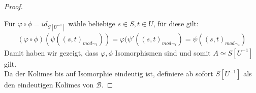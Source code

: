 \documentclass[10pt,a4paper]{report}
\newcommand{\lok}[2]{#1 [#2^{-1}]}
\newcommand{\loke}[3]{(#1,#2)_{mod\sim_{#3}}}
\begin{document}
\begin{proof}
\begin{center}
\end{center}
Für $\varphi \circ \phi = id_{\lok{S}{U}}$ wähle beliebige $s \in S , t \in U$, für diese gilt:
\begin{gather*}
(\varphi \circ \phi)(\psi(\loke{s}{t}{t})) =
 \varphi (\psi'(\loke{s}{t}{t}) =
  \psi(\loke{s}{t}{t})
\end{gather*}
Damit haben wir gezeigt, dass $\varphi,\phi$ Isomorphismen sind und somit $A \simeq \lok{S}{U}$ gilt.\\
Da der Kolimes bis auf Isomorphie eindeutig ist, definiere ab sofort $\lok{S}{U}$ als den eindeutigen Kolimes von $\mathcal{B}$.
 \end{proof}
\end{document}
